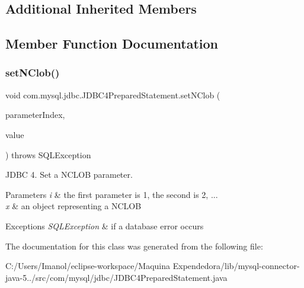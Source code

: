 \subsection*{Additional Inherited Members}


\subsection{Member Function Documentation}
\mbox{\label{classcom_1_1mysql_1_1jdbc_1_1_j_d_b_c4_prepared_statement_ad7e3b70ef27aa09c94258bce2851c063}} 
\subsubsection{\texorpdfstring{set\+N\+Clob()}{setNClob()}}
{\footnotesize\ttfamily void com.\+mysql.\+jdbc.\+J\+D\+B\+C4\+Prepared\+Statement.\+set\+N\+Clob (\begin{DoxyParamCaption}\item[{int}]{parameter\+Index,  }\item[{N\+Clob}]{value }\end{DoxyParamCaption}) throws S\+Q\+L\+Exception}

J\+D\+BC 4. Set a N\+C\+L\+OB parameter.


\begin{DoxyParams}{Parameters}
{\em i} & the first parameter is 1, the second is 2, ... \\
\hline
{\em x} & an object representing a N\+C\+L\+OB\\
\hline
\end{DoxyParams}

\begin{DoxyExceptions}{Exceptions}
{\em S\+Q\+L\+Exception} & if a database error occurs \\
\hline
\end{DoxyExceptions}


The documentation for this class was generated from the following file\+:\begin{DoxyCompactItemize}
\item 
C\+:/\+Users/\+Imanol/eclipse-\/workspace/\+Maquina Expendedora/lib/mysql-\/connector-\/java-\/5../src/com/mysql/jdbc/J\+D\+B\+C4\+Prepared\+Statement.\+java\end{DoxyCompactItemize}
